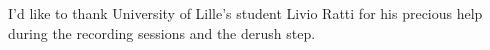\documentclass{article}
\begin{document}
%
%


\begin{acknowledgments}
I'd like to thank University of Lille's student Livio Ratti for his precious help during the recording sessions and the derush step.
\end{acknowledgments} 


\end{document}
